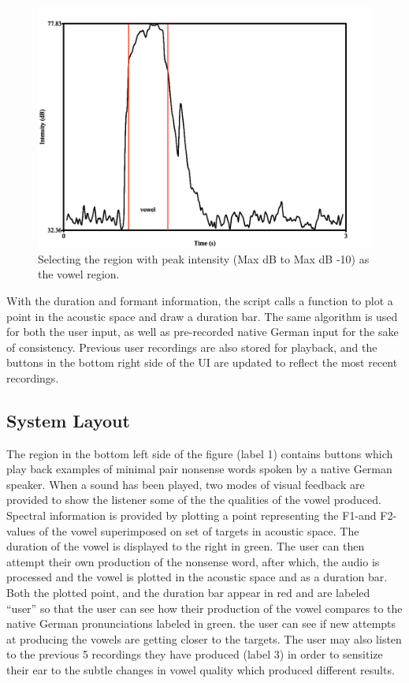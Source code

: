 \begin{figure}[H]
 \centering
 \includegraphics[scale=1.2]{intensity_for_paper.png}
 \caption{Selecting the region with peak intensity (Max dB to Max dB -10) as the vowel region.}
 \label{fig:intensity}
\end{figure}

With the duration and formant information, the script calls a function to plot a point in the acoustic space and draw a duration bar. The same algorithm is used for both the user input, as well as pre-recorded native German input for the sake of consistency. Previous user recordings are also stored for playback, and the buttons in the bottom right side of the UI are updated to reflect the most recent recordings.


\subsection{System Layout}
The region in the bottom left side of the figure (label 1) contains buttons which play back examples of minimal pair nonsense words spoken by a native German speaker. When a sound has been played, two modes of visual feedback are provided to show the listener some of the the qualities of the vowel produced. Spectral information is provided by plotting a point representing the F1-and F2-values of the vowel superimposed on set of targets in acoustic space.  The duration of the vowel is displayed to the right in green. The user can then attempt their own production of the nonsense word, after which, the audio is processed and the vowel is plotted in the acoustic space and as a duration bar. Both the plotted point, and the duration bar appear in red and are labeled ``user'' so that the user can see how their production of the vowel compares to the native German pronunciations labeled in green. the user can see if new attempts at producing the vowels are getting closer to the targets. The user may also listen to the previous 5 recordings they have produced (label 3) in order to sensitize their ear to the subtle changes in vowel quality which produced different results.


